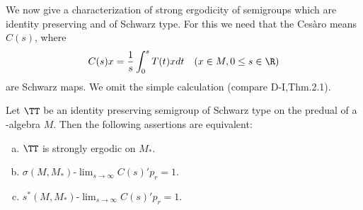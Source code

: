 We now give a characterization of strong ergodicity of semigroups which are identity preserving and of Schwarz type.
For this we need that the Cesàro means $C(s)$, where
\[
C(s)x = \frac{1}{s}\int_{0}^{s} T(t)xdt \quad (x \in M, 0 \leq s \in \R)
\]
are Schwarz maps.
We omit the simple calculation (compare D-I,Thm.2.1).

\begin{proposition}\label{prop:d4-3.3}
Let $\TT$ be an identity preserving semigroup of Schwarz type on the predual of a \WA-algebra $M$.
Then the following assertions are equivalent:

\begin{enumerate}[(a)]
\item
$\TT$ is strongly ergodic on $M_{*}$.

\item
$\sigma(M,M_{*})\text{-}\lim_{s \to \infty} C(s)'p_{r} = 1$.

\item
$s^{*}(M,M_{*})\text{-}\lim_{s \to \infty} C(s)'p_{r} = 1$.
\end{enumerate}
\end{proposition}

